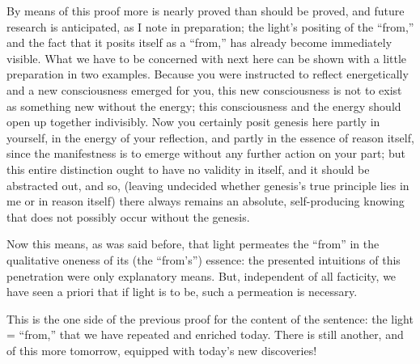 By means of this proof more is
nearly proved than should be proved,
and future research is anticipated,
as I note in preparation;
the light's positing of the “from,”
and the fact that it posits itself as a “from,”
has already become immediately visible.
What we have to be concerned with next here
can be shown with a little preparation in two examples.
Because you were instructed to reflect energetically
and a new consciousness emerged for you,
this new consciousness is not to exist
as something new without the energy;
this consciousness and the energy should
open up together indivisibly.
Now you certainly posit genesis here
partly in yourself,
in the energy of your reflection,
and partly in the essence of reason itself,
since the manifestness is to emerge
without any further action on your part;
but this entire distinction ought to have no validity in itself,
and it should be abstracted out, and so,
(leaving undecided whether genesis's true principle
lies in me or in reason itself)
there always remains an absolute, self-producing knowing
that does not possibly occur without the genesis.

Now this means, as was said before,
that light permeates the “from”
in the qualitative oneness of its (the “from's”) essence:
the presented intuitions of this penetration
were only explanatory means.
But, independent of all facticity,
we have seen a priori
that if light is to be,
such a permeation is necessary.

This is the one side of the previous proof
for the content of the sentence:
the light = “from,”
that we have repeated and enriched today.
There is still another,
and of this more tomorrow,
equipped with today's new discoveries!

